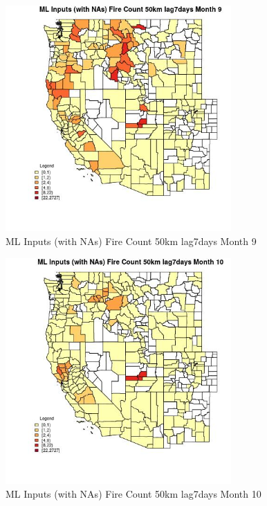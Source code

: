 \begin{figure} 
\centering  
\includegraphics[width=0.77\textwidth]{Code_Outputs/Report_ML_input_PM25_Step4_part_f_de_duplicated_aveswNAs_CountyFire_Count_50km_lag7daysmedianMonth9.jpg} 
\caption{\label{fig:Report_ML_input_PM25_Step4_part_f_de_duplicated_aveswNAsCountyFire_Count_50km_lag7daysmedianMonth9}ML Inputs (with NAs) Fire Count 50km lag7days Month 9} 
\end{figure} 
 

\begin{figure} 
\centering  
\includegraphics[width=0.77\textwidth]{Code_Outputs/Report_ML_input_PM25_Step4_part_f_de_duplicated_aveswNAs_CountyFire_Count_50km_lag7daysmedianMonth10.jpg} 
\caption{\label{fig:Report_ML_input_PM25_Step4_part_f_de_duplicated_aveswNAsCountyFire_Count_50km_lag7daysmedianMonth10}ML Inputs (with NAs) Fire Count 50km lag7days Month 10} 
\end{figure} 
 

